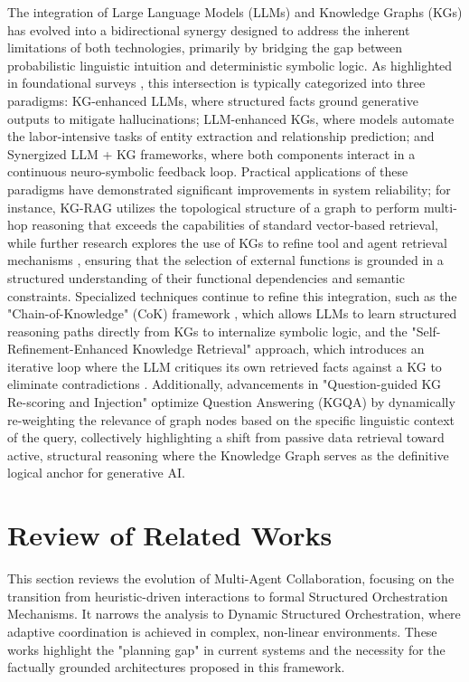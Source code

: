 The integration of Large Language Models (LLMs) and Knowledge Graphs (KGs) has evolved into a bidirectional synergy designed to address the inherent limitations of both technologies, primarily by bridging the gap between probabilistic linguistic intuition and deterministic symbolic logic. 
As highlighted in foundational surveys \citet{Pan_2024,kau2024combiningknowledgegraphslarge}, this intersection is typically categorized into three paradigms: KG-enhanced LLMs, where structured facts ground generative outputs to mitigate hallucinations; LLM-enhanced KGs, where models automate the labor-intensive tasks of entity extraction and relationship prediction; and Synergized LLM + KG frameworks, where both components interact in a continuous neuro-symbolic feedback loop. 
Practical applications of these paradigms have demonstrated significant improvements in system reliability; for instance, KG-RAG \citep{sanmartin2024kgragbridginggapknowledge} utilizes the topological structure of a graph to perform multi-hop reasoning that exceeds the capabilities of standard vector-based retrieval, 
while further research explores the use of KGs to refine tool and agent retrieval mechanisms \citep{nizar2025agentasagraphknowledgegraphbasedtool}, ensuring that the selection of external functions is grounded in a structured understanding of their functional dependencies and semantic constraints. 
Specialized techniques continue to refine this integration, such as the "Chain-of-Knowledge" (CoK) framework \citep{zhang2024chainofknowledgeintegratingknowledgereasoning}, which allows LLMs to learn structured reasoning paths directly from KGs to internalize symbolic logic, and the "Self-Refinement-Enhanced Knowledge Retrieval" approach, which introduces an iterative loop where the LLM critiques its own retrieved facts against a KG to eliminate contradictions \citep{niu2024mitigatinghallucinationslargelanguage}. 
Additionally, advancements in "Question-guided KG Re-scoring and Injection" \citep{zhang-etal-2024-question} optimize Question Answering (KGQA) by dynamically re-weighting the relevance of graph nodes based on the specific linguistic context of the query, collectively highlighting a shift from passive data retrieval toward active, structural reasoning where the Knowledge Graph serves as the definitive logical anchor for generative AI.

\section{Review of Related Works}
This section reviews the evolution of Multi-Agent Collaboration, focusing on the transition from heuristic-driven interactions to formal Structured Orchestration Mechanisms. It narrows the analysis to Dynamic Structured Orchestration, where adaptive coordination is achieved in complex, non-linear environments. These works highlight the "planning gap" in current systems and the necessity for the factually grounded architectures proposed in this framework.

